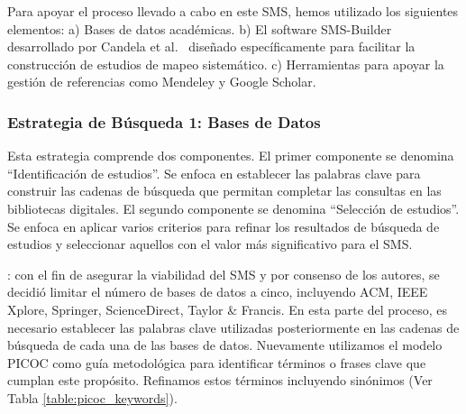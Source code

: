 Para apoyar el proceso llevado a cabo en este SMS, hemos utilizado los siguientes elementos: a) Bases de datos académicas. b) El software SMS-Builder desarrollado por Candela et al.~\cite{sms-builder-repo} diseñado específicamente para facilitar la construcción de estudios de mapeo sistemático. c) Herramientas para apoyar la gestión de referencias como Mendeley y Google Scholar. %



\subsubsection{Estrategia de Búsqueda 1: Bases de Datos}

Esta estrategia comprende dos componentes. El primer componente se denomina ``Identificación de estudios''. Se enfoca en establecer las palabras clave para construir las cadenas de búsqueda que permitan completar las consultas en las bibliotecas digitales. El segundo componente se denomina ``Selección de estudios''. Se enfoca en aplicar varios criterios para refinar los resultados de búsqueda de estudios y seleccionar aquellos con el valor más significativo para el SMS.\@

: con el fin de asegurar la viabilidad del SMS y por consenso de los autores, se decidió limitar el número de bases de datos a cinco, incluyendo ACM, IEEE Xplore, Springer, ScienceDirect, Taylor \& Francis. En esta parte del proceso, es necesario establecer las palabras clave utilizadas posteriormente en las cadenas de búsqueda de cada una de las bases de datos. Nuevamente utilizamos el modelo PICOC como guía metodológica para identificar términos o frases clave que cumplan este propósito. Refinamos estos términos incluyendo sinónimos (Ver Tabla \ref{table:picoc_keywords}).

